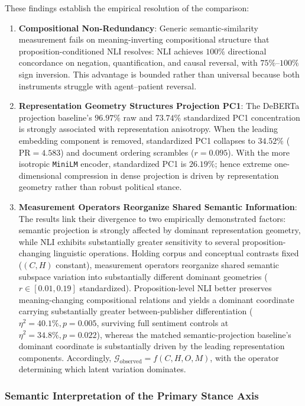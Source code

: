These findings establish the empirical resolution of the comparison:
\begin{enumerate}
    \item \textbf{Compositional Non-Redundancy}: Generic semantic-similarity measurement fails on meaning-inverting compositional structure that proposition-conditioned NLI resolves: NLI achieves $100\%$ directional concordance on negation, quantification, and causal reversal, with $75\%$--$100\%$ sign inversion. This advantage is bounded rather than universal because both instruments struggle with agent--patient reversal.
    \item \textbf{Representation Geometry Structures Projection PC1}: The DeBERTa projection baseline's $96.97\%$ raw and $73.74\%$ standardized PC1 concentration is strongly associated with representation anisotropy. When the leading embedding component is removed, standardized PC1 collapses to $34.52\%$ ($\mathrm{PR} = 4.583$) and document ordering scrambles ($r = 0.095$). With the more isotropic \texttt{MiniLM} encoder, standardized PC1 is $26.19\%$; hence extreme one-dimensional compression in dense projection is driven by representation geometry rather than robust political stance.
    \item \textbf{Measurement Operators Reorganize Shared Semantic Information}: The results link their divergence to two empirically demonstrated factors: semantic projection is strongly affected by dominant representation geometry, while NLI exhibits substantially greater sensitivity to several proposition-changing linguistic operations. Holding corpus and conceptual contrasts fixed ($(C,H)$ constant), measurement operators reorganize shared semantic subspace variation into substantially different dominant geometries ($r \in [0.01,0.19]$ standardized). Proposition-level NLI better preserves meaning-changing compositional relations and yields a dominant coordinate carrying substantially greater between-publisher differentiation ($\eta^2=40.1\%, p=0.005$, surviving full sentiment controls at $\eta^2=34.8\%, p=0.022$), whereas the matched semantic-projection baseline's dominant coordinate is substantially driven by the leading representation components. Accordingly, $\mathcal{G}_{\text{observed}} = f(C,H,O,M)$, with the operator determining which latent variation dominates.
\end{enumerate}

\subsubsection{Semantic Interpretation of the Primary Stance Axis}
\label{sec:semantic_interpretation_pc1}

